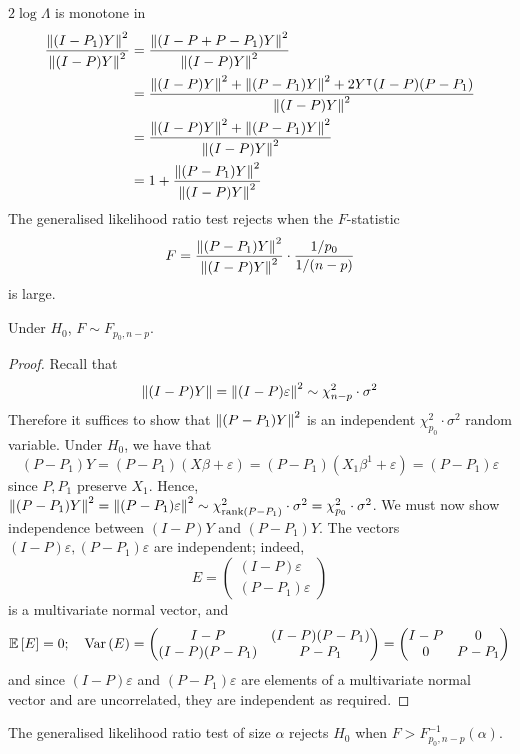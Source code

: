 \( 2 \log \Lambda \) is monotone in
\begin{align*}
	\frac{\norm{(I-P_1)Y}^2}{\norm{(I-P)Y}^2} &= \frac{\norm{(I-P+P-P_1)Y}^2}{\norm{(I-P)Y}^2} \\
	&= \frac{\norm{(I-P)Y}^2 + \norm{(P-P_1)Y}^2 + 2Y^\intercal (I-P)(P-P_1)}{\norm{(I-P)Y}^2 }\\
	&= \frac{\norm{(I-P)Y}^2 + \norm{(P-P_1)Y}^2}{\norm{(I-P)Y}^2} \\
	&= 1 + \frac{\norm{(P-P_1)Y}^2}{\norm{(I-P)Y}^2}
\end{align*}
The generalised likelihood ratio test rejects when the \( F \)-statistic
\[ F = \frac{\norm{(P-P_1)Y}^2}{\norm{(I-P)Y}^2} \cdot \frac{1/p_0}{1/(n-p)} \]
is large.
\begin{theorem}
	Under \( H_0 \), \( F \sim F_{p_0,n-p} \).
\end{theorem}
\begin{proof}
	Recall that
	\[ \norm{(I-P)Y} = \norm{(I-P)\varepsilon}^2 \sim \chi^2_{n-p} \cdot \sigma^2 \]
	Therefore it suffices to show that \( \norm{(P-P_1)Y}^2 \) is an independent \( \chi^2_{p_0} \cdot \sigma^2 \) random variable.
	Under \( H_0 \), we have that
	\[ (P-P_1)Y = (P-P_1)(X\beta+\varepsilon) = (P-P_1)(X_1 \beta^1 + \varepsilon) = (P-P_1)\varepsilon \]
	since \( P, P_1 \) preserve \( X_1 \).
	Hence, \( \norm{(P-P_1)Y}^2 = \norm{(P-P_1)\varepsilon}^2 \sim \chi^2_{\rank (P-P_1)} \cdot \sigma^2 = \chi^2_{p_0} \cdot \sigma^2 \).
	We must now show independence between \( (I-P)Y \) and \( (P-P_1)Y \).
	The vectors \( (I-P)\varepsilon, (P-P_1)\varepsilon \) are independent; indeed,
	\[ E = \begin{pmatrix}
		(I-P)\varepsilon \\
		(P-P_1)\varepsilon
	\end{pmatrix} \]
	is a multivariate normal vector, and
	\[ \mathbb{E}\left[{E}\right] = 0;\quad \operatorname{Var}\left({E}\right) = \begin{pmatrix}
		I-P & (I-P)(P-P_1) \\
		(I-P)(P-P_1) & P-P_1
	\end{pmatrix} = \begin{pmatrix}
		I-P & 0 \\
		0 & P-P_1
	\end{pmatrix} \]
	and since \( (I-P)\varepsilon \) and \( (P-P_1)\varepsilon \) are elements of a multivariate normal vector and are uncorrelated, they are independent as required.
\end{proof}
The generalised likelihood ratio test of size \( \alpha \) rejects \( H_0 \) when \( F > F^{-1}_{p_0,n-p}(\alpha) \).
